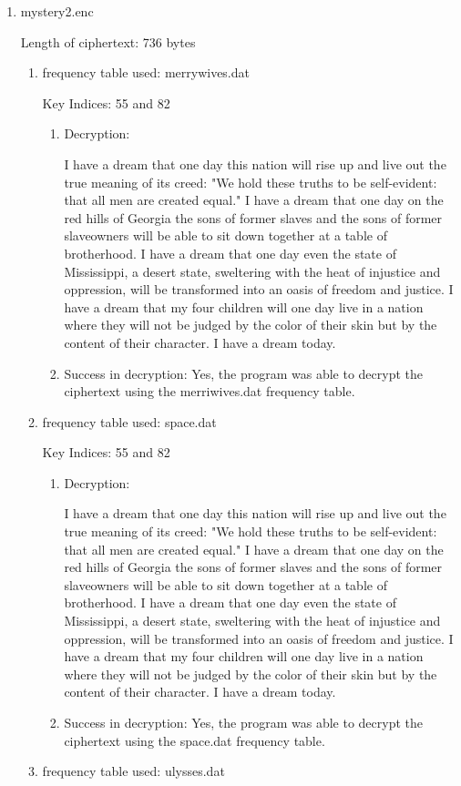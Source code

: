 \documentclass{ashoka-crypto}
\begin{document}
\begin{enumerate}
\item mystery2.enc

Length of ciphertext: 736 bytes

\begin{enumerate}
\item frequency table used: merrywives.dat

Key Indices: 55 and 82
\begin{enumerate}
\item Decryption:

I have a dream that one day this nation will rise up and live out the true meaning of its creed: "We hold these truths to be self-evident: that all men are created equal." I have a dream that one day on the red hills of Georgia the sons of former slaves and the sons of former slaveowners will be able to sit down together at a table of brotherhood. I have a dream that one day even the state of Mississippi, a desert state, sweltering with the heat of injustice and oppression, will be transformed into an oasis of freedom and justice. I have a dream that my four children will one day live in a nation where they will not be judged by the color of their skin but by the content of their character. I have a dream today.

\item Success in decryption: Yes, the program was able to decrypt the ciphertext using the merriwives.dat frequency table.
\end{enumerate}
\item frequency table used: space.dat

Key Indices: 55 and 82
\begin{enumerate}
\item Decryption:

I have a dream that one day this nation will rise up and live out the true meaning of its creed: "We hold these truths to be self-evident: that all men are created equal." I have a dream that one day on the red hills of Georgia the sons of former slaves and the sons of former slaveowners will be able to sit down together at a table of brotherhood. I have a dream that one day even the state of Mississippi, a desert state, sweltering with the heat of injustice and oppression, will be transformed into an oasis of freedom and justice. I have a dream that my four children will one day live in a nation where they will not be judged by the color of their skin but by the content of their character. I have a dream today.

\item Success in decryption: Yes, the program was able to decrypt the ciphertext using the space.dat frequency table.
\end{enumerate}
\item frequency table used: ulysses.dat


\end{enumerate}
\end{enumerate}
\end{document}
